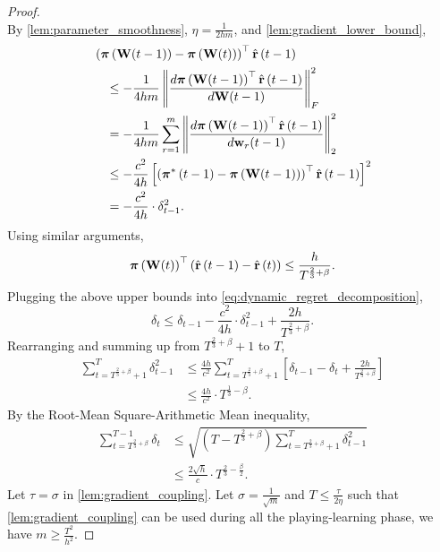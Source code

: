\begin{proof}
\begin{equation*}
\end{equation*}
By \cref{lem:parameter_smoothness}, $\eta = \frac{1}{2 h m}$, and \cref{lem:gradient_lower_bound},
\begin{equation*}
\begin{split}
    &\left( {\boldsymbol{\pi}}\left( {\mathbf{W}}(t-1) \right) - {\boldsymbol{\pi}}\left( {\mathbf{W}}(t) \right) \right)^\top \hat{{\mathbf{r}}}\left(t-1\right) \\
    &\quad \le - \frac{1}{4 h m} \left\| \frac{d {\boldsymbol{\pi}}\left( {\mathbf{W}}(t-1) \right)^\top \hat{{\mathbf{r}}}\left(t-1\right)}{d {\mathbf{W}}(t-1)} \right\|_F^2 \\
    &\quad = - \frac{1}{4 h m} \sum\limits_{r=1}^{m}{ \left\| \frac{d {\boldsymbol{\pi}}\left( {\mathbf{W}}(t-1) \right)^\top \hat{{\mathbf{r}}}\left(t-1\right)}{d {\mathbf{w}}_r(t-1)} \right\|_2^2 } \\
    &\quad \le - \frac{c^2}{4 h} \left[ \left( {{\boldsymbol{\pi}}^*\left(t-1\right)} - {\boldsymbol{\pi}}\left( {\mathbf{W}}(t-1) \right) \right)^\top \hat{{\mathbf{r}}}\left(t-1\right)  \right]^2 \\
    &\quad = - \frac{c^2}{4 h} \cdot \delta_{t-1}^2.
\end{split}
\end{equation*}
Using similar arguments,
\begin{equation*}
    {\boldsymbol{\pi}}\left( {\mathbf{W}}(t) \right)^\top \left( \hat{{\mathbf{r}}}\left(t-1\right) - \hat{{\mathbf{r}}}\left(t\right)  \right) \le \frac{h}{T^{\frac{2}{3} + \beta}}.
\end{equation*}
Plugging the above upper bounds into \cref{eq:dynamic_regret_decomposition},
\begin{equation*}
    \delta_t \le \delta_{t-1} - \frac{c^2}{4 h} \cdot \delta_{t-1}^2 + \frac{2h}{T^{\frac{2}{3} + \beta}}.
\end{equation*}
Rearranging and summing up from $T^{\frac{2}{3} + \beta} + 1$ to $T$,
\begin{equation*}
\begin{split}
    \sum\limits_{t=T^{\frac{2}{3}+ \beta}+1}^{T}{\delta_{t-1}^2} &\le \frac{4 h}{ c^2} \sum\limits_{t=T^{\frac{2}{3}+ \beta}+1}^{T} { \left[ \delta_{t-1} - \delta_t + \frac{2h}{T^{\frac{2}{3} + \beta}} \right] } \\
    &\le \frac{4 h}{ c^2} \cdot T^{\frac{1}{3} - \beta}.
\end{split}
\end{equation*}
By the Root-Mean Square-Arithmetic Mean inequality,
\begin{equation*}
\begin{split}
    \sum\limits_{t=T^{\frac{2}{3}+ \beta}}^{T-1}{\delta_{t}} &\le \sqrt{\left(T  - T^{\frac{2}{3}+ \beta} \right) \sum\limits_{t=T^{\frac{2}{3}+ \beta}+1}^{T}{\delta_{t-1}^2}} \\
    &\le \frac{2 \sqrt{h}}{c} \cdot T^{\frac{2}{3} - \frac{\beta}{2}}.
\end{split}
\end{equation*}
Let $\tau = \sigma$ in \cref{lem:gradient_coupling}. Let $\sigma = \frac{1}{\sqrt{m}}$ and $T \le \frac{\tau}{2 \eta}$ such that \cref{lem:gradient_coupling} can be used during all the playing-learning phase, we have $m \ge \frac{T^2}{h^2}$.
\end{proof}



